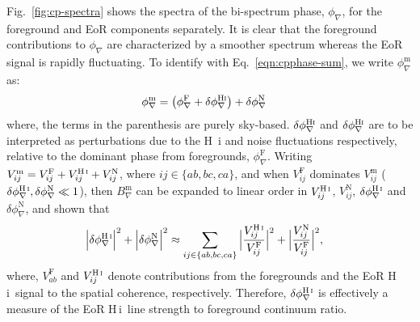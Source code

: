 \documentclass[
reprint,
superscriptaddress,
amsmath,
amssymb,
aps,
prd
]{revtex4-1}
\newcommand{\HI}{H\,{\sc i}}
\begin{document}
Fig.~\ref{fig:cp-spectra} shows the spectra of the bi-spectrum phase, $\phi_\nabla$, for the foreground and EoR components separately. It is clear that the foreground contributions to $\phi_\nabla$ are characterized by a smoother spectrum whereas the EoR signal is rapidly fluctuating. To identify with Eq.~\ref{eqn:cpphase-sum}, we write $\phi_\nabla^\textrm{m}$ as:
\begin{align}\label{eqn:cp-components}
  \phi_\nabla^\textrm{m} &= \left(\phi_\nabla^\textrm{F} + \delta\phi_\nabla^\textrm{H{\sc i}}\right) + \delta\phi_\nabla^\textrm{N}
\end{align}
where, the terms in the parenthesis are purely sky-based. $\delta\phi_\nabla^\textrm{H{\sc i}}$ and $\delta\phi_\nabla^\textrm{H{\sc i}}$ are to be interpreted as perturbations due to the H~{\sc i} and noise fluctuations respectively, relative to the dominant phase from foregrounds, $\phi_\nabla^\textrm{F}$. Writing $V_{ij}^\textrm{m}=V_{ij}^\textrm{F}+V_{ij}^\textrm{\HI}+V_{ij}^\textrm{N}$, where $ij \in \{ab, bc, ca\}$, and when $V_{ij}^\textrm{F}$ dominates $V_{ij}^\textrm{m}$ ($\delta\phi_\nabla^\textrm{\HI}, \delta\phi_\nabla^\textrm{N} \ll 1$), then $B_\nabla^\textrm{m}$ can be expanded to linear order in $V_{ij}^\textrm{\HI}$, $V_{ij}^\textrm{N}$, $\delta\phi_\nabla^\textrm{\HI}$ and $\delta\phi_\nabla^\textrm{N}$, and shown that 
\begin{align}
  \Big|\delta\phi_\nabla^\textrm{\HI}\Big|^2 + \Big|\delta\phi_\nabla^\textrm{N}\Big|^2 &\approx \sum_{ij\in \{ab, bc, ca\}} \Big|\frac{V_{ij}^\textrm{\HI}}{V_{ij}^\textrm{F}}\Big|^2 + \Big|\frac{V_{ij}^\textrm{N}}{V_{ij}^\textrm{F}}\Big|^2,
\end{align}
where, $V_{ab}^\textrm{F}$ and $V_{ij}^\textrm{\HI}$ denote contributions from the foregrounds and the EoR \HI\ signal to the spatial coherence, respectively. Therefore, $\delta\phi_\nabla^\textrm{\HI}$ is effectively a measure of the EoR \HI\ line strength to foreground continuum ratio.
\end{document}
